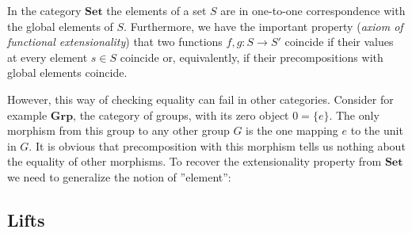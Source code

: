     \begin{remark}\label{cat:global_elements_remark}
        In the category $\mathbf{Set}$ the elements of a set $S$ are in one-to-one correspondence with the global elements of $S$. Furthermore, we have the important property (\textit{axiom of functional extensionality}) that two functions $f,g:S\rightarrow S'$ coincide if their values at every element $s\in S$ coincide or, equivalently, if their precompositions with global elements coincide.

        However, this way of checking equality can fail in other categories. Consider for example $\mathbf{Grp}$, the category of groups, with its zero object $0=\{e\}$. The only morphism from this group to any other group $G$ is the one mapping $e$ to the unit in $G$. It is obvious that precomposition with this morphism tells us nothing about the equality of other morphisms. To recover the extensionality property from $\mathbf{Set}$ we need to generalize the notion of ''element'':
    \end{remark}


\subsection{Lifts}

